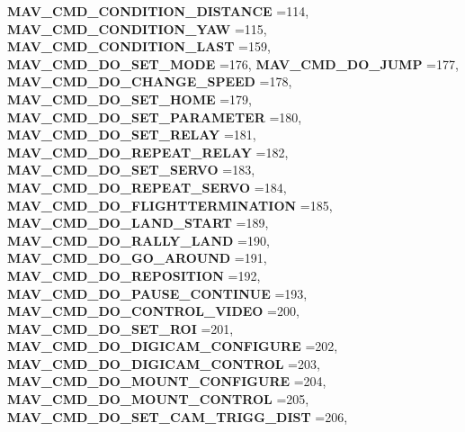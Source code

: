\begin{DoxyCompactItemize}
\textbf{ M\+A\+V\+\_\+\+C\+M\+D\+\_\+\+C\+O\+N\+D\+I\+T\+I\+O\+N\+\_\+\+D\+I\+S\+T\+A\+N\+CE} =114, 
\textbf{ M\+A\+V\+\_\+\+C\+M\+D\+\_\+\+C\+O\+N\+D\+I\+T\+I\+O\+N\+\_\+\+Y\+AW} =115, 
\textbf{ M\+A\+V\+\_\+\+C\+M\+D\+\_\+\+C\+O\+N\+D\+I\+T\+I\+O\+N\+\_\+\+L\+A\+ST} =159, 
\newline
\textbf{ M\+A\+V\+\_\+\+C\+M\+D\+\_\+\+D\+O\+\_\+\+S\+E\+T\+\_\+\+M\+O\+DE} =176, 
\textbf{ M\+A\+V\+\_\+\+C\+M\+D\+\_\+\+D\+O\+\_\+\+J\+U\+MP} =177, 
\textbf{ M\+A\+V\+\_\+\+C\+M\+D\+\_\+\+D\+O\+\_\+\+C\+H\+A\+N\+G\+E\+\_\+\+S\+P\+E\+ED} =178, 
\textbf{ M\+A\+V\+\_\+\+C\+M\+D\+\_\+\+D\+O\+\_\+\+S\+E\+T\+\_\+\+H\+O\+ME} =179, 
\newline
\textbf{ M\+A\+V\+\_\+\+C\+M\+D\+\_\+\+D\+O\+\_\+\+S\+E\+T\+\_\+\+P\+A\+R\+A\+M\+E\+T\+ER} =180, 
\textbf{ M\+A\+V\+\_\+\+C\+M\+D\+\_\+\+D\+O\+\_\+\+S\+E\+T\+\_\+\+R\+E\+L\+AY} =181, 
\textbf{ M\+A\+V\+\_\+\+C\+M\+D\+\_\+\+D\+O\+\_\+\+R\+E\+P\+E\+A\+T\+\_\+\+R\+E\+L\+AY} =182, 
\textbf{ M\+A\+V\+\_\+\+C\+M\+D\+\_\+\+D\+O\+\_\+\+S\+E\+T\+\_\+\+S\+E\+R\+VO} =183, 
\newline
\textbf{ M\+A\+V\+\_\+\+C\+M\+D\+\_\+\+D\+O\+\_\+\+R\+E\+P\+E\+A\+T\+\_\+\+S\+E\+R\+VO} =184, 
\textbf{ M\+A\+V\+\_\+\+C\+M\+D\+\_\+\+D\+O\+\_\+\+F\+L\+I\+G\+H\+T\+T\+E\+R\+M\+I\+N\+A\+T\+I\+ON} =185, 
\textbf{ M\+A\+V\+\_\+\+C\+M\+D\+\_\+\+D\+O\+\_\+\+L\+A\+N\+D\+\_\+\+S\+T\+A\+RT} =189, 
\textbf{ M\+A\+V\+\_\+\+C\+M\+D\+\_\+\+D\+O\+\_\+\+R\+A\+L\+L\+Y\+\_\+\+L\+A\+ND} =190, 
\newline
\textbf{ M\+A\+V\+\_\+\+C\+M\+D\+\_\+\+D\+O\+\_\+\+G\+O\+\_\+\+A\+R\+O\+U\+ND} =191, 
\textbf{ M\+A\+V\+\_\+\+C\+M\+D\+\_\+\+D\+O\+\_\+\+R\+E\+P\+O\+S\+I\+T\+I\+ON} =192, 
\textbf{ M\+A\+V\+\_\+\+C\+M\+D\+\_\+\+D\+O\+\_\+\+P\+A\+U\+S\+E\+\_\+\+C\+O\+N\+T\+I\+N\+UE} =193, 
\textbf{ M\+A\+V\+\_\+\+C\+M\+D\+\_\+\+D\+O\+\_\+\+C\+O\+N\+T\+R\+O\+L\+\_\+\+V\+I\+D\+EO} =200, 
\newline
\textbf{ M\+A\+V\+\_\+\+C\+M\+D\+\_\+\+D\+O\+\_\+\+S\+E\+T\+\_\+\+R\+OI} =201, 
\textbf{ M\+A\+V\+\_\+\+C\+M\+D\+\_\+\+D\+O\+\_\+\+D\+I\+G\+I\+C\+A\+M\+\_\+\+C\+O\+N\+F\+I\+G\+U\+RE} =202, 
\textbf{ M\+A\+V\+\_\+\+C\+M\+D\+\_\+\+D\+O\+\_\+\+D\+I\+G\+I\+C\+A\+M\+\_\+\+C\+O\+N\+T\+R\+OL} =203, 
\textbf{ M\+A\+V\+\_\+\+C\+M\+D\+\_\+\+D\+O\+\_\+\+M\+O\+U\+N\+T\+\_\+\+C\+O\+N\+F\+I\+G\+U\+RE} =204, 
\newline
\textbf{ M\+A\+V\+\_\+\+C\+M\+D\+\_\+\+D\+O\+\_\+\+M\+O\+U\+N\+T\+\_\+\+C\+O\+N\+T\+R\+OL} =205, 
\textbf{ M\+A\+V\+\_\+\+C\+M\+D\+\_\+\+D\+O\+\_\+\+S\+E\+T\+\_\+\+C\+A\+M\+\_\+\+T\+R\+I\+G\+G\+\_\+\+D\+I\+ST} =206, 

\end{DoxyCompactItemize}
